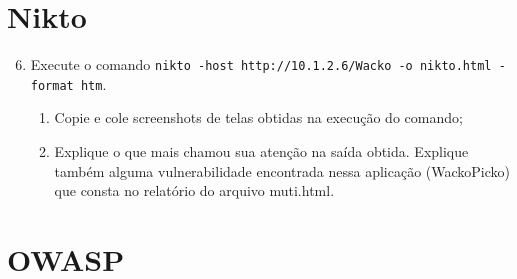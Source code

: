\documentclass{article}
\begin{document}
    \section{Nikto}

    \begin{superframe}
        \begin{enumerate}
            \setcounter{enumi}{5}
            \item Execute o comando \texttt{nikto -host http://10.1.2.6/Wacko -o nikto.html -format htm}.
                \begin{enumerate}
                    \item Copie e cole screenshots de telas obtidas na execução do
                        comando;
                    \item Explique o que mais chamou sua atenção na saída obtida.
                        Explique também alguma vulnerabilidade encontrada nessa
                        aplicação (WackoPicko) que consta no relatório do arquivo
                        muti.html.
                \end{enumerate}
        \end{enumerate}
    \end{superframe}

    \section{OWASP}
\end{document}
